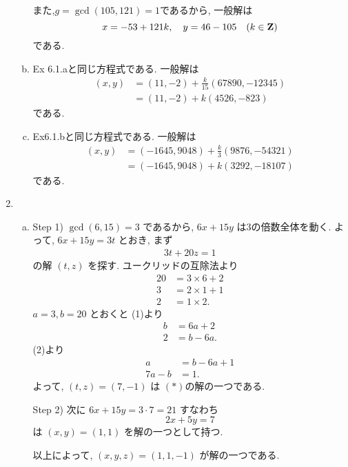 \begin{enumerate}[6.1]
\begin{enumerate}[(a)]
    また,$g = \gcd(105, 121) = 1$であるから, 一般解は
    \[
      x = -53 + 121k, \quad
      y = 46 - 105 \quad
      (k \in \mathbf{Z})
    \]
    である.
  \item
    Ex 6.1.aと同じ方程式である.
    一般解は
    \begin{align*}
      (x, y)
        &= (11, -2) + \frac{k}{15} (67890, -12345) \\
        &= (11, -2) + k(4526, -823)
    \end{align*}
    である.
  \item
    Ex6.1.bと同じ方程式である.
    一般解は
    \begin{align*}
      (x, y)
        &= (-1645, 9048) + \frac{k}{3}(9876, -54321) \\
        &= (-1645, 9048) + k(3292, -18107)
    \end{align*}
    である.
  \end{enumerate}
\item
  \begin{enumerate}[(a)] \item
    Step 1) $\gcd(6, 15) = 3$ であるから, $6x + 15y$ は$3$の倍数全体を動く.
    よって, $6x + 15y = 3t$ とおき, まず
    \begin{align}
      3t + 20z = 1 \tag{$\ast$}
    \end{align}
    の解 $(t, z)$ を探す.
    ユークリッドの互除法より
    \begin{align}
      20 &= 3 \times 6 + 2 \tag{1} \\
      3 &= 2 \times 1 + 1 \tag{2} \\
      2 &= 1 \times 2. \tag{3}
    \end{align}
    $a = 3, b = 20$ とおくと (1)より
    \begin{align*}
      b &= 6a + 2 \\
      2 &= b - 6a.
    \end{align*}
    (2)より
    \begin{align*}
    a &= b - 6a + 1 \\
    7a - b &= 1.
    \end{align*}
    よって, $(t, z) = (7, -1)$ は $(\ast)$の解の一つである.

  Step 2)
    次に $6x + 15y = 3 \cdot 7 = 21$ すなわち
    \[
      2x + 5y = 7
    \]
    は $(x, y) = (1, 1)$ を解の一つとして持つ.

    以上によって, $(x, y, z) = (1, 1, -1)$ が解の一つである.
  \end{enumerate}
\end{enumerate} %

